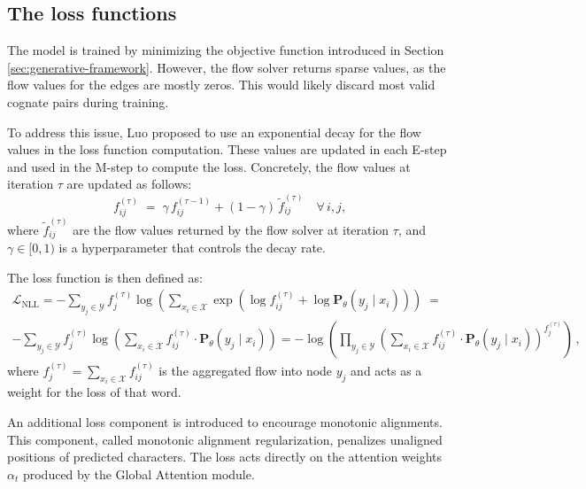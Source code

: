 \subsection{The loss functions}
The model is trained by minimizing the objective function introduced in Section \ref{sec:generative-framework}.
However, the flow solver returns sparse values, as the flow values for the edges are mostly zeros.
This would likely discard most valid cognate pairs during training.

To address this issue, Luo proposed to use an exponential decay for the flow values in the loss function computation.
These values are updated in each E-step and used in the M-step to compute the loss.
Concretely, the flow values at iteration $\tau$ are updated as follows:
\[
f_{ij}^{(\tau)} \;=\; \gamma\,f_{ij}^{(\tau-1)} + (1-\gamma)\,\tilde{f}_{ij}^{(\tau)} \quad \forall\, i,j,
\]
where $\tilde{f}_{ij}^{(\tau)}$ are the flow values returned by the flow solver at iteration $\tau$, and $\gamma\in[0,1)$ is a hyperparameter that controls the decay rate.

The loss function is then defined as:
\begin{gather*}
\mathcal{L}_{\mathrm{NLL}} =
- \sum_{y_j \in \mathcal{Y}} f_j^{(\tau)} \log \left(\sum_{x_i \in \mathcal{X}} \exp \!\left(\log f_{ij}^{(\tau)} + \log \mathbf{P}_{\theta}(y_j \mid x_i) \right) \right) \;= \\[2pt]
- \sum_{y_j \in \mathcal{Y}} f_j^{(\tau)} \log \left(\sum_{x_i \in \mathcal{X}} f_{ij}^{(\tau)} \cdot \mathbf{P}_{\theta}(y_j \mid x_i) \right) = - \log \left(\prod_{y_j \in \mathcal{Y}} \left( \sum_{x_i \in \mathcal{X}} f_{ij}^{(\tau)} \cdot \mathbf{P}_{\theta}(y_j \mid x_i) \right)^{f_j^{(\tau)}} \right) \, ,
\end{gather*}
where $f_j^{(\tau)} = \sum_{x_i \in \mathcal{X}} f_{ij}^{(\tau)}$ is the aggregated flow into node $y_j$ and acts as a weight for the loss of that word.

An additional loss component is introduced to encourage monotonic alignments.
This component, called monotonic alignment regularization, penalizes unaligned positions of predicted characters.
The loss acts directly on the attention weights $\alpha_t$ produced by the Global Attention module.

